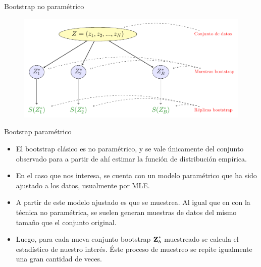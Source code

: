 \begin{frame}{Bootstrap no paramétrico}
  \begin{figure}[tp]
    \centerline
    {\includegraphics[width=0.9\linewidth]{gfx/bootstrap}}
    \label{fig:bootesq}
  \end{figure}
\end{frame}        

\begin{frame}{Bootsrap paramétrico}
  \begin{itemize} 
    \itemsep1em
    \item El bootstrap clásico es no paramétrico, y se vale únicamente del conjunto observado para a partir de ahí estimar la función de distribución empírica. 

    \item En el caso que nos interesa, se cuenta con un modelo paramétrico que ha sido ajustado a los datos, usualmente por MLE. 

    \item A partir de este modelo ajustado es que se muestrea. Al igual que en con la técnica no paramétrica, se suelen generan muestras de datos del mismo tamaño que el conjunto original. 

    \item Luego, para cada nueva conjunto bootstrap $\textbf{Z}^{*}_b$ muestreado se calcula el estadístico de nuestro interés. Éste proceso de muestreo se repite igualmente una gran cantidad de veces. 
  \end{itemize}
\end{frame}

